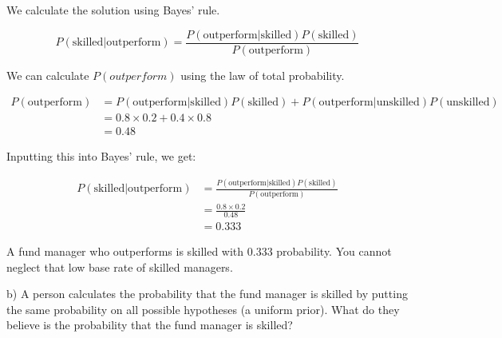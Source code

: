\documentclass[
  letterpaper,
  DIV=11,
  numbers=noendperiod]{scrreprt}
\begin{document}
\begin{tcolorbox}[enhanced jigsaw, title=\textcolor{quarto-callout-tip-color}{\faLightbulb}\hspace{0.5em}{Answer}, toprule=.15mm, colback=white, breakable, titlerule=0mm, colframe=quarto-callout-tip-color-frame, coltitle=black, opacityback=0, rightrule=.15mm, colbacktitle=quarto-callout-tip-color!10!white, bottomtitle=1mm, opacitybacktitle=0.6, arc=.35mm, bottomrule=.15mm, toptitle=1mm, leftrule=.75mm, left=2mm]

We calculate the solution using Bayes' rule.

\[
P(\text{skilled}|\text{outperform})=\frac{P(\text{outperform}|\text{skilled})P(\text{skilled})}{P(\text{outperform})}
\]

We can calculate \(P(outperform)\) using the law of total probability.

\begin{align*}
P(\text{outperform})&=P(\text{outperform}|\text{skilled})P(\text{skilled})+P(\text{outperform}|\text{unskilled})P(\text{unskilled}) \\[6pt]
&=0.8\times 0.2+0.4\times 0.8 \\[6pt]
&=0.48
\end{align*}

Inputting this into Bayes' rule, we get:

\begin{align*}
P(\text{skilled}|\text{outperform})&=\frac{P(\text{outperform}|\text{skilled})P(\text{skilled})}{P(\text{outperform})} \\[6pt]
&=\frac{0.8\times 0.2}{0.48} \\[6pt]
&=0.333
\end{align*}

A fund manager who outperforms is skilled with 0.333 probability. You
cannot neglect that low base rate of skilled managers.

\end{tcolorbox}

b) A person calculates the probability that the fund manager is skilled
by putting the same probability on all possible hypotheses (a uniform
prior). What do they believe is the probability that the fund manager is
skilled?
\end{document}
